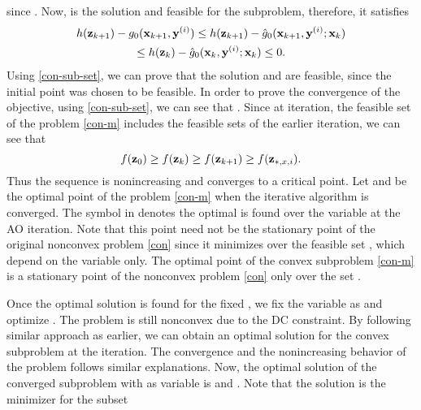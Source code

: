 since . Now,  is the solution and feasible for the  subproblem, therefore, it satisfies
\begin{multline}
h(\mz_{k+1}) - {g}_0(\mx_{k+1},\iterate{\myb}{i}) \leq h(\mz_{k+1}) - \hat{g}_0(\mx_{k+1},\iterate{\myb}{i};\mxb_k) \\
\leq h(\mz_{k}) - \hat{g}_0(\mx_{k},\iterate{\myb}{i};\mxb_k) \leq 0. \label{con-sub-set}
\end{multline}
Using \eqref{con-sub-set}, we can prove that the solution  and  are feasible, since the initial point  was chosen to be feasible. In order to prove the convergence of the objective, using \eqref{con-sub-set}, we can see that . Since at  iteration, the feasible set of the problem \eqref{con-m} includes the feasible sets of the earlier iteration, we can see that 
\begin{equation} \label{con-convergence}
f(\mz_0) \geq f(\mz_k) \geq f(\mz_{k+1}) \geq f(\mz_{\ast,x,i}). 
\end{equation}
Thus the sequence  is nonincreasing and converges to a critical point. Let \me{\mx_{\ast}} and  be the optimal point of the problem \eqref{con-m} when the iterative algorithm is converged. The symbol  in  denotes the optimal \me{\mz} is found over the variable \me{\mx} at the  \ac{AO} iteration. Note that this point need not be the stationary point of the original nonconvex problem \eqref{con} since it minimizes over the feasible set , which depend on the variable \me{\mx} only. The optimal point  of the convex subproblem \eqref{con-m} is a stationary point of the nonconvex problem \eqref{con} only over the set . 

Once the optimal solution is found for the fixed \me{\my}, we fix the variable \me{\mx} as  and optimize \me{\my}. The problem is still nonconvex due to the \ac{DC} constraint. By following similar approach as earlier, we can obtain an optimal solution  for the convex subproblem at the  iteration. The convergence and the nonincreasing behavior of the problem follows similar explanations. Now, the optimal solution of the converged subproblem with \me{\my} as variable is \me{\my_{\ast}} and . Note that the solution  is the minimizer for the subset 


